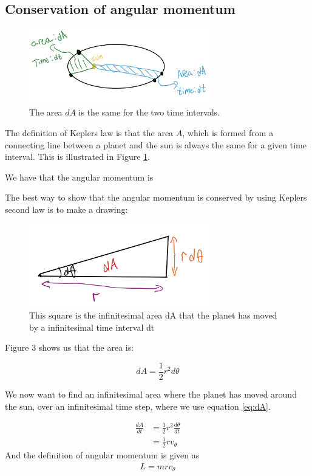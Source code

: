 \documentclass{article}
\begin{document}
\subsection{Conservation of angular momentum}

\begin{figure}[H]
	\centering
	\includegraphics[width=80mm]{K2L.jpg}
	\caption{The area $dA$ is the same for the two time intervals.}
	\label{fig:Kep}
\end{figure}

The definition of Keplers law is that the area $A$, which is formed from a connecting line between a planet and the sun is always the same for a given time interval. This is illustrated in Figure \ref{fig:Kep}.

We have that the angular momentum is 

The best way to show that the angular momentum is conserved by using Keplers second law is to make a drawing:

\begin{figure}[H]
	\centering
	\includegraphics[width=80mm]{sketch.jpg}
	\caption{This square is the infinitesimal area dA that the planet has moved by a infinitesimal time interval dt}
	\label{fig:1bplot}
\end{figure}

Figure 3 shows us that the area is:

\begin{equation}
    dA=\frac{1}{2}r^2d\theta
\label{eq:dA}
\end{equation}

We now want to find an infinitesimal area where the planet has moved around the sun, over an infinitesimal time step, where we use equation \ref{eq:dA}.

\begin{align}
    \frac{dA}{dt}&=\frac{1}2{r^2}\frac{d\theta}{dt}\\
    &=\frac{1}{2}rv_\theta
    \label{eq:dadt}
\end{align}
And the definition of angular momentum is given as
\begin{align*}
    L=mrv_\theta
\end{align*}
\end{document}
